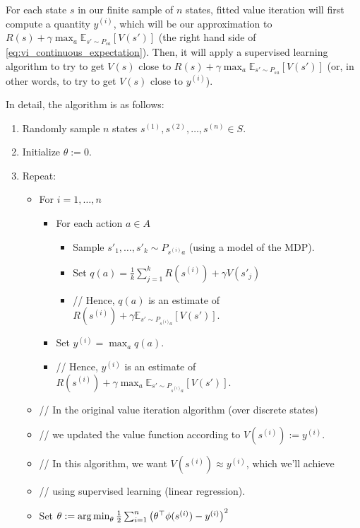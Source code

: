 For each state $s$ in our finite sample of $n$ states, fitted value iteration
will first compute a quantity $y^{(i)}$, which will be our approximation
to $R(s) + \gamma \max_a \mathbb E_{s'\sim P_{sa}}[V(s')]$ (the right hand side of \cref{eq:vi_continuous_expectation}). Then,
it will apply a supervised learning algorithm to try to get $V(s)$ close to
$R(s) + \gamma \max_a \mathbb E_{s'\sim P_{sa}}[V(s')]$ (or, in other words, to try to get $V(s)$ close to
$y^{(i)}$).

In detail, the algorithm is as follows:
\begin{enumerate}
    \item Randomly sample $n$ states $s^{(1)},s^{(2)},\ldots, s^{(n)} \in S$. %
    \item Initialize $\theta := 0$.
    \item Repeat:
    \begin{itemize}
        \item[] For $i = 1,\ldots,n$
        \begin{itemize}
            \item[] For each action $a \in A$
            \begin{itemize}
                \item[] Sample $s'_1,\ldots,s'_k \sim P_{s^(i) a}$ (using a model of the MDP).
                \item[] Set $q(a) = \frac{1}{k} \sum_{j=1}^k R(s^{(i)}) + \gamma V(s'_j)$
                \item[] // Hence, $q(a)$ is an estimate of $R(s^{(i)})+\gamma \mathbb E_{s'\sim P_{s^{(i)} a}}[V(s')]$.
            \end{itemize}
            \item[] Set $y^{(i)} = \max_a q(a)$.
            \item[] // Hence, $y^{(i)}$ is an estimate of $R(s^{(i)})+\gamma \max_a \mathbb E_{s'\sim P_{s^{(i)} a}} [V(s')]$.
        \end{itemize}
        \item[] // In the original value iteration algorithm (over discrete states)
        \item[] // we updated the value function according to $V(s^{(i)}) := y^{(i)}$.
        \item[] // In this algorithm, we want $V(s^{(i)}) \approx y^{(i)}$, which we'll achieve
        \item[] // using supervised learning (linear regression).
        \item[] Set $\theta := \argmin_\theta \frac{1}{2}\sum^n_{i=1}\left( \theta^\top \phi(s^{(i)}) - y^{(i)} \right)^2$
    \end{itemize}
\end{enumerate}

